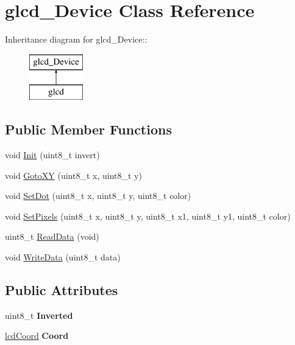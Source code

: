 \hypertarget{classglcd___device}{
\section{glcd\_\-Device Class Reference}
\label{classglcd___device}
}
Inheritance diagram for glcd\_\-Device::\begin{figure}[H]
\begin{center}
\leavevmode
\includegraphics[height=2cm]{classglcd___device}
\end{center}
\end{figure}
\subsection*{Public Member Functions}
\begin{DoxyCompactItemize}
\item 
void \hyperlink{classglcd___device_a15bd97b27644f9962f2e50a442b4cdcc}{Init} (uint8\_\-t invert)
\item 
void \hyperlink{classglcd___device_ad5fd910ef008e2d04e8d9b4fd8cac543}{GotoXY} (uint8\_\-t x, uint8\_\-t y)
\item 
void \hyperlink{classglcd___device_a1916258e850cd839172ce318a0b903fd}{SetDot} (uint8\_\-t x, uint8\_\-t y, uint8\_\-t color)
\item 
void \hyperlink{classglcd___device_a4950fe109b27cb1cdcdbabe367d02c80}{SetPixels} (uint8\_\-t x, uint8\_\-t y, uint8\_\-t x1, uint8\_\-t y1, uint8\_\-t color)
\item 
uint8\_\-t \hyperlink{classglcd___device_a2ec1756ae0c7787fad676d6398c73de3}{ReadData} (void)
\item 
void \hyperlink{classglcd___device_a209d1ba245e7e02eb65e07c15ce0461d}{WriteData} (uint8\_\-t data)
\end{DoxyCompactItemize}
\subsection*{Public Attributes}
\begin{DoxyCompactItemize}
\item 
\hypertarget{classglcd___device_a553e9a639bfbf4f971d90ea0846f2882}{
uint8\_\-t {\bfseries Inverted}}
\label{classglcd___device_a553e9a639bfbf4f971d90ea0846f2882}

\item 
\hypertarget{classglcd___device_a72748fb53a38a2d471ed46bf3a22e698}{
\hyperlink{structlcd_coord}{lcdCoord} {\bfseries Coord}}
\label{classglcd___device_a72748fb53a38a2d471ed46bf3a22e698}

\end{DoxyCompactItemize}


